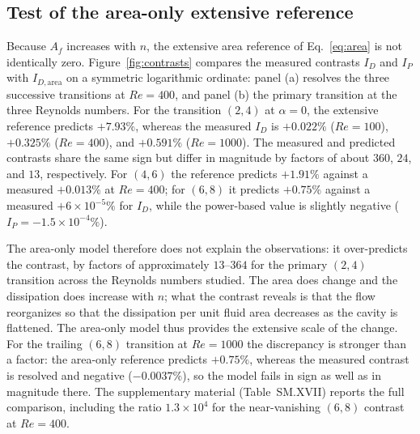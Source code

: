 \subsection{Test of the area-only extensive reference}
\label{subsec:arearesult}

Because $A_f$ increases with $n$, the extensive area reference of Eq.~\eqref{eq:area} is not identically zero. Figure~\ref{fig:contrasts} compares the measured contrasts $I_D$ and $I_P$ with $I_{D,\mathrm{area}}$ on a symmetric logarithmic ordinate: panel (a) resolves the three successive transitions at $Re=400$, and panel (b) the primary transition at the three Reynolds numbers. For the transition $(2,4)$ at $\alpha=0$, the extensive reference predicts $+7.93\%$, whereas the measured $I_D$ is $+0.022\%$ ($Re=100$), $+0.325\%$ ($Re=400$), and $+0.591\%$ ($Re=1000$). The measured and predicted contrasts share the same sign but differ in magnitude by factors of about $360$, $24$, and $13$, respectively. For $(4,6)$ the reference predicts $+1.91\%$ against a measured $+0.013\%$ at $Re=400$; for $(6,8)$ it predicts $+0.75\%$ against a measured $+6\times10^{-5}\%$ for $I_D$, while the power-based value is slightly negative ($I_P=-1.5\times10^{-4}\%$). 

The area-only model therefore does not explain the observations: it over-predicts the contrast, by factors of approximately $13$--$364$ for the primary $(2,4)$ transition across the Reynolds numbers studied. The area does change and the dissipation does increase with $n$; what the contrast reveals is that the flow reorganizes so that the dissipation per unit fluid area decreases as the cavity is flattened. The area-only model thus provides the extensive scale of the change. For the trailing $(6,8)$ transition at $Re=1000$ the discrepancy is stronger than a factor: the area-only reference predicts $+0.75\%$, whereas the measured contrast is resolved and negative ($-0.0037\%$), so the model fails in sign as well as in magnitude there. The supplementary material (Table~SM.XVII) reports the full comparison, including the ratio $1.3\times10^{4}$ for the near-vanishing $(6,8)$ contrast at $Re=400$.


